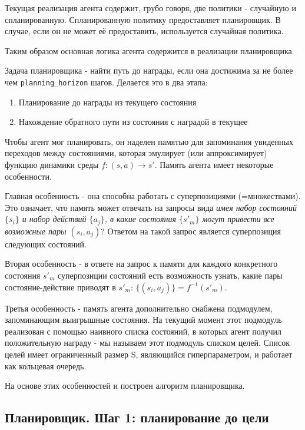 \documentclass[a4paper]{article}
\begin{document}
Текущая реализация агента содержит, грубо говоря, две политики - случайную и спланированную. Спланированную политику предоставляет планировщик. В случае, если он не может её предоставить, используется случайная политика.

Таким образом основная логика агента содержится в реализации планировщика.

Задача планировщика - найти путь до награды, если она достижима за не более чем \verb|planning_horizon| шагов. Делается это в два этапа:

\begin{enumerate}
    \item Планирование до награды из текущего состояния
    \item Нахождение обратного пути из состояния с наградой в текущее
\end{enumerate}

Чтобы агент мог планировать, он наделен памятью для запоминания увиденных переходов между состояниями, которая эмулирует (или аппроксимирует) функцию динамики среды $f: (s, a) \rightarrow s'$. Память агента имеет некоторые особенности.

Главная особенность - она способна работать с суперпозициями (=множествами). Это означает, что память может отвечать на запросы вида \textit{имея набор состояний $\{s_i\}$ и набор действий $\{a_j\}$, в какие состояния $\{s'_m\}$ могут привести все возможные пары $(s_i, a_j)$}? Ответом на такой запрос является суперпозиция следующих состояний.

Вторая особенность - в ответе на запрос к памяти для каждого конкретного состояния $s'_m$ суперпозиции состояний есть возможность узнать, какие пары состояние-действие приводят в $s'_m$: $\{(s_i, a_j)\} = f^{-1}(s'_m)$.

Третья особенность - память агента дополнительно снабжена подмодулем, запоминающим выигрышные состояния. На текущий момент этот подмодуль реализован с помощью наивного списка состояний, в которых агент получил положительную награду - мы называем этот подмодуль списком целей. Список целей имеет ограниченный размер S, являющийся гиперпараметром, и работает как кольцевая очередь.

На основе этих особенностей и построен алгоритм планировщика.

\subsection{Планировщик. Шаг 1: планирование до цели}
\end{document}
